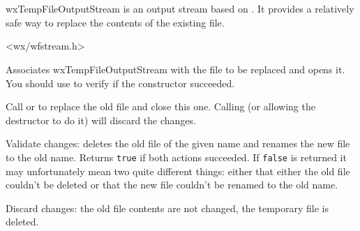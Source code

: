%
%

\section{}\label{wxtempfileoutputstream}

wxTempFileOutputStream is an output stream based on . It
provides a relatively safe way to replace the contents of the
existing file.




<wx/wfstream.h>





\label{wxtempfileoutputstreamwxtempfileoutputstream}


Associates wxTempFileOutputStream with the file to be replaced and opens it. You should use 
 to verify if the constructor succeeded.

Call  or  to
replace the old file and close this one. Calling  
(or allowing the destructor to do it) will discard the changes.


\label{wxtempfileoutputstreamcommit}


Validate changes: deletes the old file of the given name and renames the new
file to the old name. Returns {\tt true} if both actions succeeded. If {\tt false} is
returned it may unfortunately mean two quite different things: either that
either the old file couldn't be deleted or that the new file couldn't be renamed
to the old name.


\label{wxtempfileoutputstreamdiscard}


Discard changes: the old file contents are not changed, the temporary file is
deleted.

